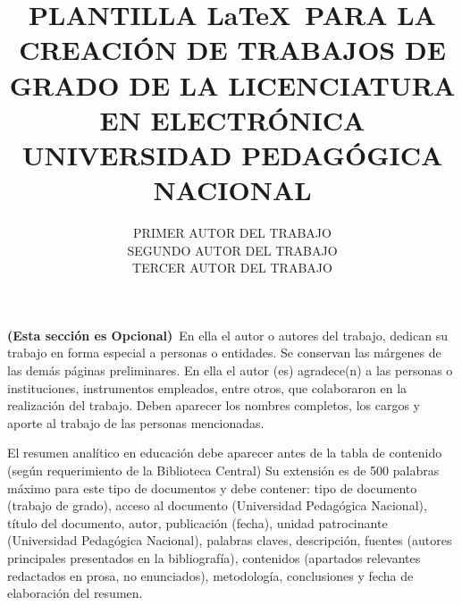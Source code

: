 


\title{PLANTILLA \LaTeX ~PARA LA CREACIÓN DE TRABAJOS DE GRADO DE LA LICENCIATURA EN ELECTRÓNICA UNIVERSIDAD PEDAGÓGICA NACIONAL}
\author{PRIMER AUTOR DEL TRABAJO\\SEGUNDO AUTOR DEL TRABAJO\\TERCER AUTOR DEL TRABAJO} 



\portada
\aprobacion

\begin{agradecimientos}
\textbf{(Esta sección es Opcional)}~En ella el autor o autores del trabajo, dedican su  trabajo en forma especial a personas o entidades. Se 
conservan las márgenes de las demás páginas preliminares. 
En ella el autor (es) agradece(n) a las personas o instituciones, instrumentos empleados, entre otros, que 
colaboraron en la realización del trabajo. Deben aparecer los nombres completos, los cargos y aporte al 
trabajo de las personas mencionadas.
\end{agradecimientos}

\begin{RAE}
El resumen analítico en educación debe aparecer antes de la tabla de contenido (según requerimiento de la 
Biblioteca Central) Su extensión es de 500 palabras máximo para este tipo de documentos y debe contener: 
tipo de documento (trabajo de grado), acceso al documento (Universidad Pedagógica Nacional), título del 
documento, autor, publicación (fecha), unidad patrocinante (Universidad Pedagógica Nacional), palabras
claves, descripción, fuentes (autores principales presentados en la bibliografía), contenidos (apartados 
relevantes redactados en prosa, no enunciados), metodología, conclusiones y fecha de elaboración del 
resumen.
\end{RAE}


\tabladecontenido
\listadefiguras
\listadetablas

\pagestyle{fancy}



 



